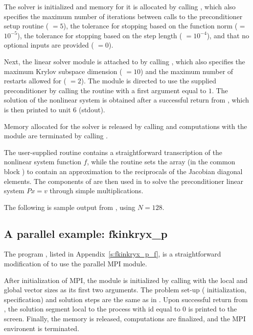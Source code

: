 The {\kinsol} solver is initialized and memory for it is allocated by
calling , which also specifies the maximum number of 
iterations between calls to the preconditioner setup routine ( $=5$),
the tolerance for stopping based on the function norm ( = $10^{-5}$),
the tolerance for stopping based on the step length ( $=10^{-4}$),
and that no optional inputs are provided ( $=0$).

Next, the {\kinspgmr} linear solver module is attached to {\kinsol} by calling
, which also specifies the maximum Krylov subspace dimension
( $=10$) and the maximum number of restarts allowed for {\spgmr}
( $=2$).  The {\kinspgmr} module is directed to use the supplied
preconditioner by  calling the  routine
with a first argument equal to $1$. The solution of the
nonlinear system is obtained after a successful return from , which
is then printed to unit 6 (stdout).

Memory allocated for the {\kinsol} solver is released by calling  and
computations with the {\nvecs} module are terminated by calling .

The user-supplied routine  contains a straightforward transcription
of the nonlinear system function $f$, while the routine  sets the
array  (in the common block ) to contain an approximation to 
the reciprocals of the Jacobian diagonal elements. The components of  are
then used in  to solve the preconditioner linear system $Px=v$
through simple multiplications.

The following is sample output from , using $N = 128$.



\subsection{A parallel example: fkinkryx\_p}\label{ss:fkinkryx_p}

The program , listed in Appendix~\ref{s:fkinkryx_p_f}, is a
straightforward modification of  to use the parallel MPI
{\nvecp} module.

After initialization of MPI, the {\nvecp} module is initialized by calling
 with the local and global vector sizes as its first two
arguments.
The problem set-up ({\kinsol} initialization, {\kinspgmr} specification) and
solution steps are the same as in . 
Upon successful return from , the solution segment local to 
the process with id equal to $0$ is printed to the screen.
Finally, the {\kinsol} memory is released, {\nvecp} computations are 
finalized, and the MPI environent is terminated. 

